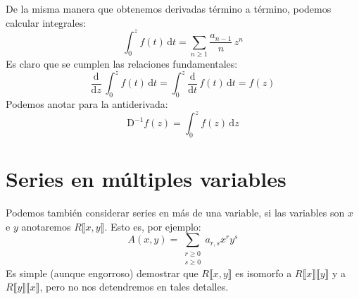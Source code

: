   De la misma manera que obtenemos derivadas término a término,
  podemos calcular integrales:%
  \begin{equation*}
    \int_0^z f(t) \, \mathrm{d} t
      = \sum_{n \ge 1} \frac{a_{n - 1}}{n} \, z^n
  \end{equation*}
  Es claro que se cumplen las relaciones fundamentales:
  \begin{equation*}
    \frac{\mathrm{d}}{\mathrm{d} z} \, \int_0^z f(t) \, \mathrm{d} t
      = \int_0^z \frac{\mathrm{d}}{\mathrm{d} t} \, f(t) \, \mathrm{d} t
      = f(z)
  \end{equation*}
  Podemos anotar para la antiderivada:
  \begin{equation*}
    \mathrm{D}^{-1} f(z)
      = \int_0^z f(z) \, \mathrm{d} z
  \end{equation*}

\section{Series en múltiples variables}
\label{sec:series-multivariables}

  Podemos también considerar series en más de una variable,
  si las variables son \(x\) e \(y\)
  anotaremos \(R\llbracket x, y \rrbracket\).
  Esto es,
  por ejemplo:
  \begin{equation*}
    A(x, y)
      = \sum_{\substack{
		r \ge 0 \\
		s \ge 0
	     }} a_{r, s} x^r y^s
  \end{equation*}
  Es simple
  (aunque engorroso)
  demostrar que \(R \llbracket x, y \rrbracket\)
  es isomorfo a \(R \llbracket x \rrbracket \llbracket y \rrbracket\)%
  y a \(R \llbracket y \rrbracket \llbracket x \rrbracket\),
  pero no nos detendremos en tales detalles.

